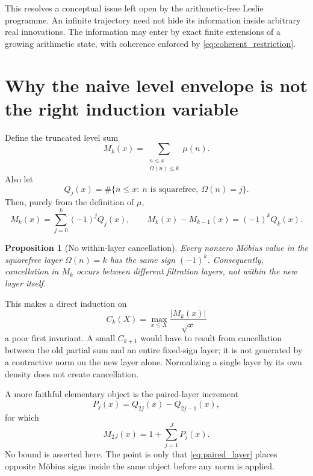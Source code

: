 \documentclass[11pt]{amsart}
\numberwithin{equation}{section}
\theoremstyle{plain}
\newtheorem{proposition}[theorem]{Proposition}
\theoremstyle{definition}
\theoremstyle{remark}
\begin{document}
This resolves a conceptual issue left open by the arithmetic-free Leslie programme.  An infinite
trajectory need not hide its information inside arbitrary real innovations.  The information may
enter by exact finite extensions of a growing arithmetic state, with coherence enforced by
\eqref{eq:coherent_restriction}.


\section{Why the naive level envelope is not the right induction variable}
\label{sec:omega_envelope_obstruction}

Define the truncated level sum
\begin{equation}
M_k(x)
=
\sum_{\substack{n\le x\\\Omega(n)\le k}}\mu(n).
\label{eq:Mk_level}
\end{equation}
Also let
\begin{equation}
Q_j(x)
=
\#\{n\le x:\ n\text{ is squarefree},\ \Omega(n)=j\}.
\label{eq:Qj_squarefree}
\end{equation}
Then, purely from the definition of $\mu$,
\begin{equation}
M_k(x)=
\sum_{j=0}^k(-1)^jQ_j(x),
\qquad
M_k(x)-M_{k-1}(x)=(-1)^kQ_k(x).
\label{eq:Mk_layer_decomposition}
\end{equation}

\begin{proposition}[No within-layer cancellation]
\label{prop:no_within_layer_cancellation}
Every nonzero M\"obius value in the squarefree layer $\Omega(n)=k$ has the same sign $(-1)^k$.
Consequently, cancellation in $M_k$ occurs between different filtration layers, not within the
new layer itself.
\end{proposition}

This makes a direct induction on
\[
C_k(X)=
\max_{x\le X}\frac{|M_k(x)|}{\sqrt x}
\]
a poor first invariant.  A small $C_{k+1}$ would have to result from cancellation between the
old partial sum and an entire fixed-sign layer; it is not generated by a contractive norm on the
new layer alone.  Normalizing a single layer by its own density does not create cancellation.

A more faithful elementary object is the paired-layer increment
\begin{equation}
P_j(x)=Q_{2j}(x)-Q_{2j-1}(x),
\label{eq:paired_layer}
\end{equation}
for which
\begin{equation}
M_{2J}(x)=1+\sum_{j=1}^J P_j(x).
\label{eq:paired_reconstruction}
\end{equation}
No bound is asserted here.  The point is only that \eqref{eq:paired_layer} places opposite
M\"obius signs inside the same object before any norm is applied.
\end{document}
